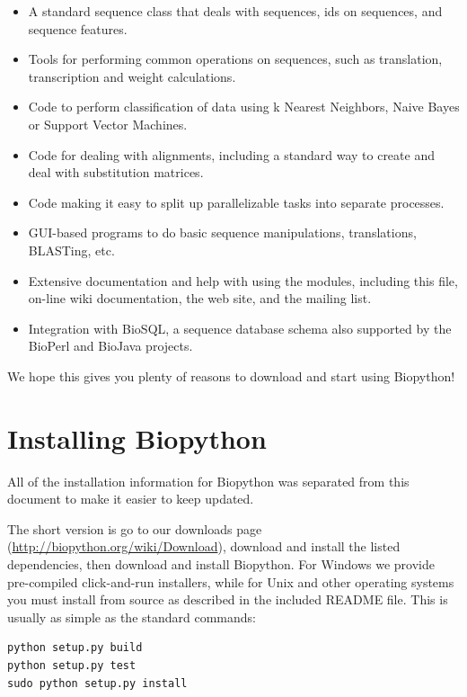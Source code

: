 \documentclass{report}
\begin{document}
\begin{itemize}
  \item A standard sequence class that deals with sequences, ids on sequences, and sequence features.

  \item Tools for performing common operations on sequences, such as translation, transcription and weight calculations.

  \item Code to perform classification of data using k Nearest Neighbors, Naive Bayes or Support Vector Machines.

  \item Code for dealing with alignments, including a standard way to create and deal with substitution matrices.

  \item Code making it easy to split up parallelizable tasks into separate processes.

  \item GUI-based programs to do basic sequence manipulations, translations, BLASTing, etc.

  \item Extensive documentation and help with using the modules, including this file, on-line wiki documentation, the web site, and the mailing list.

  \item Integration with BioSQL, a sequence database schema also supported by the BioPerl and BioJava projects.

\end{itemize}

We hope this gives you plenty of reasons to download and start using Biopython!

\section{Installing Biopython}

All of the installation information for Biopython was separated from
this document to make it easier to keep updated.

The short version is go to our downloads page (\url{http://biopython.org/wiki/Download}),
download and install the listed dependencies, then download and install Biopython.
For Windows we provide pre-compiled click-and-run installers, while for Unix and other
operating systems you must install from source as described in the included README file.
This is usually as simple as the standard commands:

\begin{verbatim}
python setup.py build
python setup.py test
sudo python setup.py install
\end{verbatim}
\end{document}
